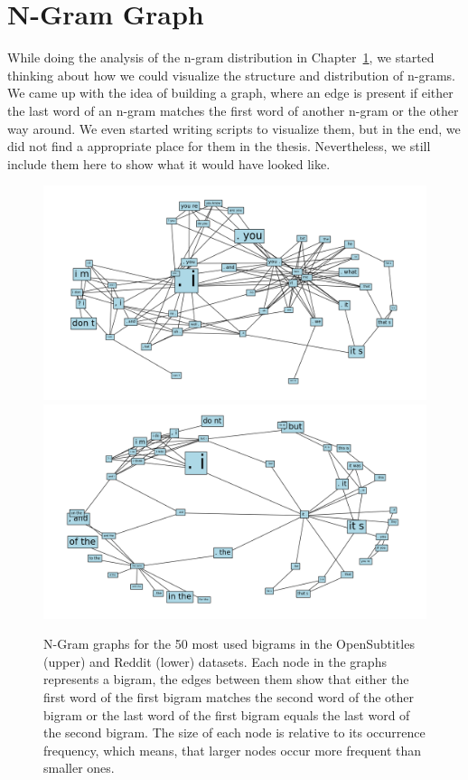 \chapter{N-Gram Graph}

While doing the analysis of the n-gram distribution in Chapter~\ref{}, we started thinking about how we could visualize the structure and distribution of n-grams. We came up with the idea of building a graph, where an edge is present if either the last word of an n-gram matches the first word of another n-gram or the other way around. We even started writing scripts to visualize them, but in the end, we did not find a appropriate place for them in the thesis. Nevertheless, we still include them here to show what it would have looked like.

\begin{figure}[H]
	\includegraphics[width=\linewidth]{img/opensubtitles_bigram_top_50_graph}
	\centering
	\small
	\endminipage\hfill
	\includegraphics[width=\linewidth]{img/reddit_bigram_top_50_graph}
	\centering
	\small
	\endminipage\hfill
	\caption{N-Gram graphs for the 50 most used bigrams in the OpenSubtitles (upper) and Reddit (lower) datasets. Each node in the graphs represents a bigram, the edges between them show that either the first word of the first bigram matches the second word of the other bigram or the last word of the first bigram equals the last word of the second bigram. The size of each node is relative to its occurrence frequency, which means, that larger nodes occur more frequent than smaller ones.}
	\label{data:ngram:graph_top_50}
\end{figure}